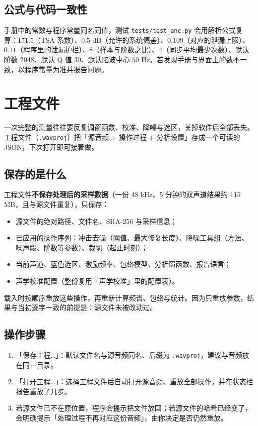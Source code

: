\documentclass[UTF8,a4paper,12pt,scheme=chinese]{ctexart}
\begin{document}
\subsection{公式与代码一致性}

手册中的常数与程序常量同名同值，测试 \texttt{tests/test\_anc.py} 会用解析公式复算：$171.5$（TSA 系数）、$0.5$ dB（允许的系统偏差）、$0.109$（对应的泄漏上限）、$0.11$（程序里的泄漏护栏）、$8$（样本与阶数之比）、$4$（同步平均最少次数）、默认阶数 $2048$、默认 Q 值 $30$、默认陷波中心 $50$ Hz。若发现手册与界面上的数不一致，以程序常量为准并报告问题。

\section{工程文件}

一次完整的测量往往要反复调窗函数、校准、降噪与选区，关掉软件后全部丢失。工程文件（\texttt{.wavproj}）把「源音频 + 操作过程 + 分析设置」存成一个可读的 JSON，下次打开即可接着做。

\subsection{保存的是什么}

工程文件\textbf{不保存处理后的采样数据}（一份 48 kHz、5 分钟的双声道结果约 115 MB，且与源文件重复），只保存：

\begin{itemize}[leftmargin=2em]
  \item 源文件的绝对路径、文件名、SHA-256 与采样信息；
  \item 已应用的操作序列：冲击去噪（阈值、最大修复长度）、降噪工具组（方法、噪声段、阶数等参数）、裁切（起止时刻）；
  \item 当前声道、蓝色选区、激励频率、包络模型、分析窗函数、报告语言；
  \item 声学校准配置（整份复用「声学校准」里的配置表）。
\end{itemize}

载入时按顺序重放这些操作，再重新计算频谱、包络与统计。因为只重放参数，结果与当初逐字一致的前提是：源文件未被改动过。

\subsection{操作步骤}

\begin{enumerate}[leftmargin=2em]
  \item 「保存工程…」：默认文件名与源音频同名、后缀为 \texttt{.wavproj}，建议与音频放在同一目录。
  \item 「打开工程…」：选择工程文件后自动打开源音频、重放全部操作，并在状态栏报告重放了几步。
  \item 若源文件已不在原位置，程序会提示把文件放回；若源文件的哈希已经变了，会明确提示「处理过程不再对应这份音频」，由你决定是否仍然重放。
\end{enumerate}
\end{document}
